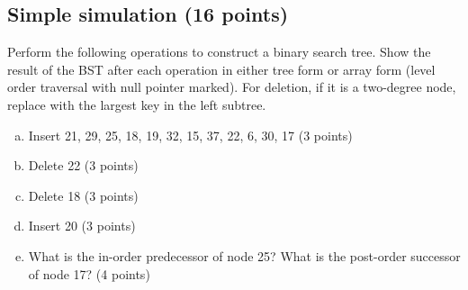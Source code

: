 \documentclass[11pt]{exam}
\begin{document}
\subsection{Simple simulation (16 points)}

Perform the following operations to construct a binary search tree. Show the result of the BST after each operation in either tree form or array form
(level order traversal with null pointer marked). For deletion, if it is a two-degree node, replace with the largest key in the left subtree.

\begin{enumerate}[a)]
\item Insert 21, 29, 25, 18, 19, 32, 15, 37, 22, 6, 30, 17 (3 points)
\begin{solution}
\end{solution}

\item Delete 22 (3 points)
\begin{solution}
\end{solution}

\item Delete 18 (3 points)
\begin{solution}
\end{solution}

\item Insert 20 (3 points)
\begin{solution}
\end{solution}

\item What is the in-order predecessor of node 25? What is the post-order successor of node 17? (4 points)
\begin{solution}
\end{solution}


\end{enumerate}

\newpage
\end{document}
